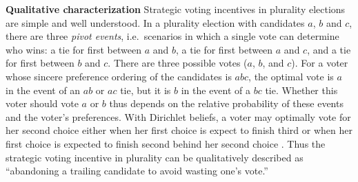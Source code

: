 \documentclass[11pt,a4paper]{article}
\begin{document}
\noindent \textbf{Qualitative characterization} Strategic voting incentives in plurality elections are simple and well understood. In a plurality election with candidates $a$, $b$ and $c$, there are three \emph{pivot events}, i.e.\ scenarios in which a single vote can determine who wins: a tie for first between $a$ and $b$, a tie for first between $a$ and $c$, and a tie for first between $b$ and $c$. There are three possible votes ($a$, $b$, and $c$). For a voter whose sincere preference ordering of the candidates is $abc$, the optimal vote is $a$ in the event of an $ab$ or $ac$ tie, but it is $b$ in the event of a $bc$ tie. Whether this voter should vote $a$ or $b$ thus depends on the relative probability of these events and the voter's preferences. With Dirichlet beliefs, a voter may optimally vote for her second choice either when her first choice is expect to finish third or when her first choice is expected to finish second behind her second choice \citep{fisher2017strategic}. Thus the strategic voting incentive in plurality can be qualitatively described as ``abandoning a trailing candidate to avoid wasting one's vote.''\\
\end{document}
